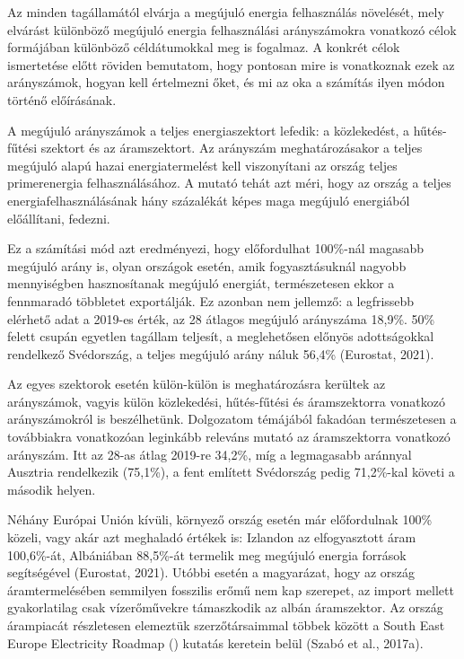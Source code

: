 \documentclass[twoside, magyar, showtrims]{corvinusphd}
\begin{document}
Az  minden tagállamától elvárja a megújuló energia
felhasználás növelését, mely elvárást különböző
megújuló energia felhasználási arányszámokra
vonatkozó célok formájában különböző céldátumokkal
meg is fogalmaz. A konkrét célok ismertetése előtt röviden
bemutatom, hogy pontosan mire is
vonatkoznak ezek az arányszámok,
hogyan kell értelmezni őket, és mi az
oka a számítás ilyen módon történő előírásának.

A megújuló arányszámok a teljes energiaszektort lefedik: 
a közlekedést, a hűtés-fűtési szektort és az áramszektort.
Az arányszám meghatározásakor a teljes megújuló alapú
hazai energiatermelést kell viszonyítani az ország
teljes primerenergia felhasználásához. A mutató tehát azt méri,
hogy az ország a teljes energiafelhasználásának hány százalékát
képes maga megújuló energiából előállítani, fedezni.

Ez a számítási mód azt eredményezi, hogy
előfordulhat 100\%-nál magasabb
megújuló arány is, olyan országok esetén,
amik fogyasztásuknál nagyobb mennyiségben
hasznosítanak megújuló energiát,
természetesen ekkor a fennmaradó többletet exportálják.
Ez azonban nem jellemző: a legfrissebb elérhető adat
a 2019-es érték, az 28 átlagos megújuló arányszáma
18,9\%. 50\% felett csupán egyetlen tagállam teljesít,
a meglehetősen előnyös adottságokkal rendelkező
Svédország, a teljes megújuló arány náluk 56,4\% (Eurostat, 2021).

Az egyes szektorok esetén külön-külön is meghatározásra kerültek
az arányszámok, vagyis külön közlekedési, hűtés-fűtési
és áramszektorra vonatkozó arányszámokról is beszélhetünk.
Dolgozatom témájából fakadóan természetesen a
továbbiakra vonatkozóan leginkább releváns mutató
az áramszektorra vonatkozó arányszám. Itt az 28-as átlag
2019-re 34,2\%, míg a legmagasabb aránnyal
Ausztria rendelkezik (75,1\%), a fent említett Svédország
pedig 71,2\%-kal követi a második helyen.

Néhány Európai Unión kívüli, környező ország esetén már előfordulnak
100\% közeli, vagy akár azt meghaladó értékek is:
Izlandon az elfogyasztott áram 100,6\%-át,
Albániában 88,5\%-át termelik meg megújuló energia források
segítségével (Eurostat, 2021). Utóbbi esetén a magyarázat, hogy
az ország áramtermelésében semmilyen
fosszilis erőmű nem kap szerepet, az import
mellett gyakorlatilag csak vízerőművekre támaszkodik
az albán áramszektor. Az ország árampiacát részletesen elemeztük
szerzőtársaimmal többek között a South East Europe Electricity Roadmap
() kutatás keretein belül (Szabó et al., 2017a). 
\end{document}
